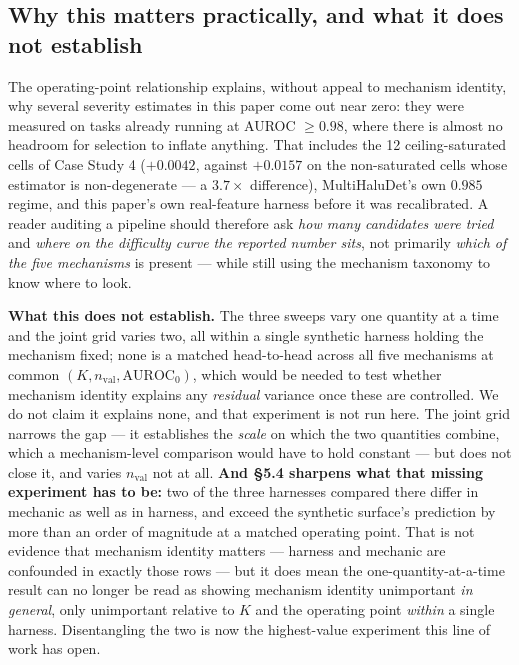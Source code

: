 \documentclass[10pt]{article} %
\begin{document}
\subsection{Why this matters practically, and what it does not establish}

The operating-point relationship explains, without appeal to mechanism
identity, why several severity estimates in this paper come out near zero:
they were measured on tasks already running at AUROC $\geq0.98$, where there
is almost no headroom for selection to inflate anything. That includes the 12
ceiling-saturated cells of Case Study 4 ($+0.0042$, against $+0.0157$ on the
non-saturated cells whose estimator is non-degenerate --- a $3.7\times$
difference), MultiHaluDet's own $0.985$ regime, and this paper's own
real-feature harness before it was recalibrated. A reader auditing a pipeline
should therefore ask \emph{how many candidates were tried} and \emph{where on
the difficulty curve the reported number sits}, not primarily \emph{which of
the five mechanisms} is present --- while still using the mechanism taxonomy to
know where to look.

\textbf{What this does not establish.} The three sweeps vary one quantity at a
time and the joint grid varies two, all within a single synthetic harness
holding the mechanism fixed; none is a matched head-to-head across all five
mechanisms at common $(K, n_{\text{val}}, \text{AUROC}_0)$, which would be
needed to test whether mechanism identity explains any \emph{residual} variance
once these are controlled. We do not claim it explains none, and that
experiment is not run here. The joint grid narrows the gap --- it establishes
the \emph{scale} on which the two quantities combine, which a mechanism-level
comparison would have to hold constant --- but does not close it, and varies
$n_{\text{val}}$ not at all. \textbf{And §5.4 sharpens what that missing
experiment has to be:} two of the three harnesses compared there differ in
mechanic as well as in harness, and exceed the synthetic surface's prediction
by more than an order of magnitude at a matched operating point. That is not
evidence that mechanism identity matters --- harness and mechanic are
confounded in exactly those rows --- but it does mean the
one-quantity-at-a-time result can no longer be read as showing mechanism
identity unimportant \emph{in general}, only unimportant relative to $K$ and
the operating point \emph{within} a single harness. Disentangling the two is
now the highest-value experiment this line of work has open.
\end{document}
